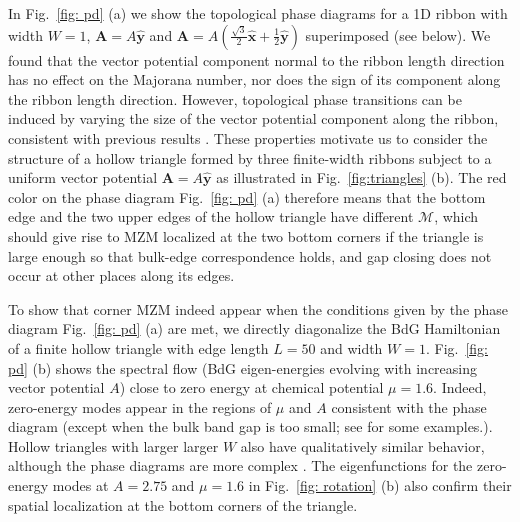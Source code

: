 \documentclass[aps,prb,twocolumn,showpacs,amsmath,amssymb,superscriptaddress]{revtex4-2}
\let\oldhat\hat
\renewcommand{\hat}[1]{\oldhat{\mathbf{#1}}}
\begin{document}
In Fig.~\ref{fig: pd} (a) we show the topological phase diagrams for a 1D ribbon with width $W=1$, $\mathbf A = A\hat{y}$ and $\mathbf A = A(\frac{\sqrt{3}}{2}\hat{x}+\frac{1}{2}\hat{y})$ superimposed (see below). We found that the vector potential component normal to the ribbon length direction has no effect on the Majorana number, nor does the sign of its component along the ribbon length direction. However, topological phase transitions can be induced by varying the size of the vector potential component along the ribbon, consistent with previous results \cite{romitoManipulatingMajoranaFermions2012, takasanSupercurrentinducedTopologicalPhase2022}. These properties motivate us to consider the structure of a hollow triangle formed by three finite-width ribbons subject to a uniform vector potential $\mathbf A = A\hat{y}$ as illustrated in Fig.~\ref{fig:triangles} (b). The red color on the phase diagram Fig.~\ref{fig: pd} (a) therefore means that the bottom edge and the two upper edges of the hollow triangle have different $\mathcal{M}$, which should give rise to MZM localized at the two bottom corners if the triangle is large enough so that bulk-edge correspondence holds, and gap closing does not occur at other places along its edges.

To show that corner MZM indeed appear when the conditions given by the phase diagram Fig.~\ref{fig: pd} (a) are met, we directly diagonalize the BdG Hamiltonian of a finite hollow triangle with edge length $L=50$ and width $W=1$. Fig.~\ref{fig: pd} (b) shows the spectral flow (BdG eigen-energies evolving with increasing vector potential $A$) close to zero energy at chemical potential $\mu=1.6$. Indeed, zero-energy modes appear in the regions of $\mu$ and $A$ consistent with the phase diagram (except when the bulk band gap is too small; see \cite{supp} for some examples.). Hollow triangles with larger larger $W$ also have qualitatively similar behavior, although the phase diagrams are more complex \cite{supp}. The eigenfunctions for the zero-energy modes at $A=2.75$ and $\mu=1.6$ in Fig.~\ref{fig: rotation} (b) also confirm their spatial localization at the bottom corners of the triangle.
\end{document}
